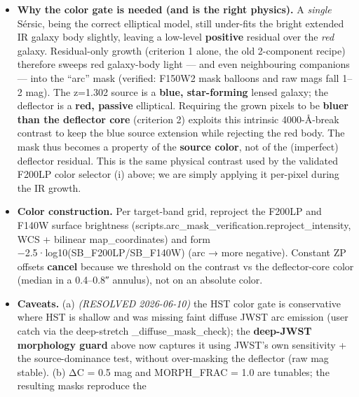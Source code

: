 \documentclass[
]{article}
\providecommand{\tightlist}{%
  \setlength{\itemsep}{0pt}\setlength{\parskip}{0pt}}
\newcommand{\BreakablePath}[1]{{\ttfamily\sloppy #1}}
\begin{document}
\begin{itemize}
  \begin{itemize}
  \tightlist
  \item
    \textbf{Why the color gate is needed (and is the right physics).} A
    \emph{single} Sérsic, being the correct elliptical model, still
    under-fits the bright extended IR galaxy body slightly, leaving a
    low-level \textbf{positive} residual over the \emph{red} galaxy.
    Residual-only growth (criterion 1 alone, the old 2-component recipe)
    therefore sweeps red galaxy-body light --- and even neighbouring
    companions --- into the ``arc'' mask (verified: F150W2 mask balloons
    and raw mags fall 1--2 mag). The z=1.302 source is a \textbf{blue,
    star-forming} lensed galaxy; the deflector is a \textbf{red,
    passive} elliptical. Requiring the grown pixels to be \textbf{bluer
    than the deflector core} (criterion 2) exploits this intrinsic
    4000-Å-break contrast to keep the blue source extension while
    rejecting the red body. The mask thus becomes a property of the
    \textbf{source color}, not of the (imperfect) deflector residual.
    This is the same physical contrast used by the validated F200LP
    color selector (i) above; we are simply applying it per-pixel during
    the IR growth.
  \item
    \textbf{Color construction.} Per target-band grid, reproject the
    F200LP and F140W surface brightness
    (\BreakablePath{scripts.\discretionary{}{}{}arc\_\discretionary{}{}{}mask\_\discretionary{}{}{}verification.\discretionary{}{}{}reproject\_\discretionary{}{}{}intensity},
    WCS + bilinear \BreakablePath{map\_\discretionary{}{}{}coordinates})
    and form
    \BreakablePath{−2.\discretionary{}{}{}5·log10(SB\_\discretionary{}{}{}F200LP/\discretionary{}{}{}SB\_\discretionary{}{}{}F140W)}
    (arc → more negative). Constant ZP offsets \textbf{cancel} because
    we threshold on the contrast vs the deflector-core color (median in
    a 0.4--0.8″ annulus), not on an absolute color.
  \item
    \textbf{Caveats.} (a) \emph{(RESOLVED 2026-06-10)} the HST color
    gate is conservative where HST is shallow and was missing faint
    diffuse JWST arc emission (user catch via the deep-stretch
    \BreakablePath{\_\discretionary{}{}{}diffuse\_\discretionary{}{}{}mask\_\discretionary{}{}{}check});
    the \textbf{deep-JWST morphology guard} above now captures it using
    JWST's own sensitivity + the source-dominance test, without
    over-masking the deflector (raw mag stable). (b) ΔC = 0.5 mag and
    MORPH\_FRAC = 1.0 are tunables; the resulting masks reproduce the

\end{itemize}
\end{itemize}
\end{document}

